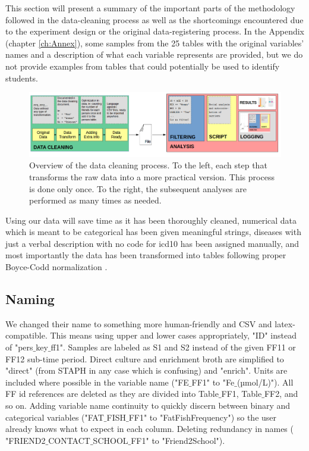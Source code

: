 This section will present a summary of the important parts of the methodology followed in the data-cleaning process as well as the shortcomings encountered due to the experiment design or the original data-registering process. In the Appendix (chapter \ref{ch:Annex}), some samples from the 25 tables with the original variables' names and a description of what each variable represents are provided, but we do not provide examples from tables that could potentially be used to identify students.

    \begin{figure}[H]
        \centering
            \includegraphics[width=0.95\linewidth]{figures/Methodology/general.png} 
        \caption{Overview of the data cleaning process. To the left, each step that transforms the raw data into a more practical version. This process is done only once. To the right, the subsequent analyses are performed as many times as needed.}
        \label{fig:Data_cleaning_summary}
    \end{figure}

Using our data will save time as it has been thoroughly cleaned, numerical data which is meant to be categorical has been given meaningful strings, diseases with just a verbal description with no code for \gls{icd10} has been assigned manually, and most importantly the data has been transformed into tables following proper Boyce-Codd normalization \cite{ref:KOHLER201888}.


\subsection{Naming}

We changed their name to something more human-friendly and CSV and latex-compatible. This means using upper and lower cases appropriately, "ID" instead of "pers$\_$key$\_$ff1". Samples are labeled as S1 and S2 instead of the given FF11 or FF12 sub-time period. Direct culture and enrichment broth are simplified to "direct" (from STAPH in any case which is confusing) and "enrich". Units are included where possible in the variable name ("FE$\_$FF1" to "Fe$\_$(µmol/L)"). All FF id references are deleted as they are divided into Table$\_$FF1, Table$\_$FF2, and so on. Adding variable name continuity to quickly discern between binary and categorical variables ("FAT$\_$FISH$\_$FF1" to "FatFishFrequency") so the user already knows what to expect in each column. Deleting redundancy in names (  "FRIEND2$\_$CONTACT$\_$SCHOOL$\_$FF1" to "Friend2School").

